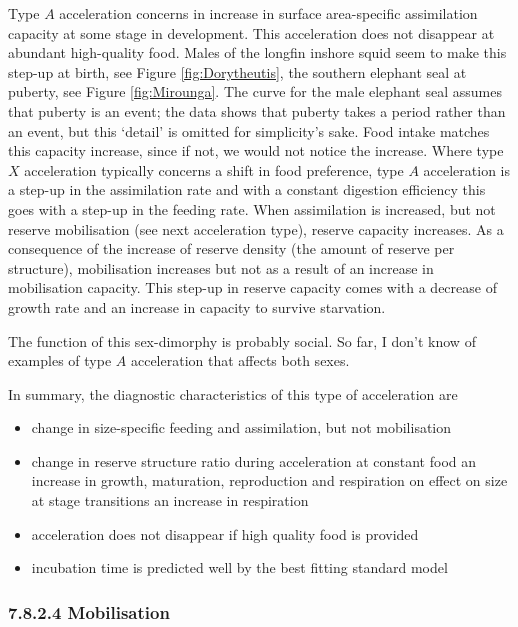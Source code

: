 Type $A$ acceleration concerns in increase in surface area-specific assimilation capacity at some stage in development.
This acceleration does not disappear at abundant high-quality food.
Males of the longfin inshore squid seem to make this step-up at birth, see Figure \ref{fig:Dorytheutis}, the southern elephant seal at puberty, see Figure \ref{fig:Mirounga}.
The curve for the male elephant seal assumes that puberty is an event; 
the data shows that puberty takes a period rather than an event, but this `detail' is omitted for simplicity's sake.
Food intake matches this capacity increase, since if not, we would not notice the increase.
Where type $X$ acceleration typically concerns a shift in food preference, type $A$ acceleration is a step-up in the assimilation rate and with a constant digestion efficiency this goes with a step-up in the feeding rate.
When assimilation is increased, but not reserve mobilisation (see next acceleration type), reserve capacity increases.
As a consequence of the increase of reserve density (the amount of reserve per structure), mobilisation increases but not as a result of an increase in mobilisation capacity.
This step-up in reserve capacity comes with a decrease of growth rate and an increase in capacity to survive starvation.

The function of this sex-dimorphy is probably social.
So far, I don't know of examples of type $A$ acceleration that affects both sexes.

In summary, the diagnostic characteristics of this type of acceleration are
\begin{itemize}
  \item change in size-specific feeding and assimilation, but not mobilisation
	\item change in reserve structure ratio during acceleration at constant food
		\subitem an increase in growth, maturation, reproduction and respiration
		\subitem on effect on  size at stage transitions
		\subitem an increase in respiration
	\item acceleration does not disappear if high quality food is provided
	\item incubation time is predicted well by the best fitting standard model
\end{itemize}


\subsubsection*{7.8.2.4 Mobilisation}
{}
\label{sssec_c:acceleration_M}

